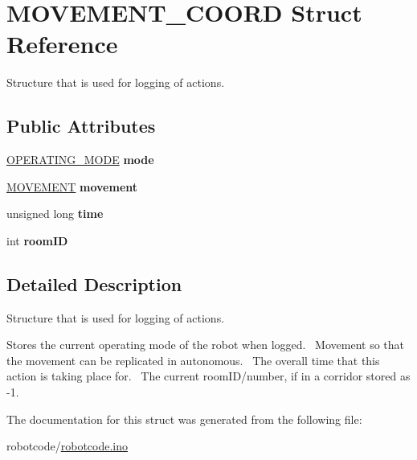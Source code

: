 \hypertarget{structMOVEMENT__COORD}{\section{M\+O\+V\+E\+M\+E\+N\+T\+\_\+\+C\+O\+O\+R\+D Struct Reference}
\label{structMOVEMENT__COORD}
}


Structure that is used for logging of actions.  


\subsection*{Public Attributes}
\begin{DoxyCompactItemize}
\item 
\hypertarget{structMOVEMENT__COORD_a0c9331c535e2f29e15afd2a3f9b58da4}{\hyperlink{robotcode_8ino_a980e950615d86dadef54f3cfaefb5fb4}{O\+P\+E\+R\+A\+T\+I\+N\+G\+\_\+\+M\+O\+D\+E} {\bfseries mode}}\label{structMOVEMENT__COORD_a0c9331c535e2f29e15afd2a3f9b58da4}

\item 
\hypertarget{structMOVEMENT__COORD_a047c0f163ebf1b8d20961ca37aa4539a}{\hyperlink{robotcode_8ino_adc716dd21485bffb9015eaeb3cfe6859}{M\+O\+V\+E\+M\+E\+N\+T} {\bfseries movement}}\label{structMOVEMENT__COORD_a047c0f163ebf1b8d20961ca37aa4539a}

\item 
\hypertarget{structMOVEMENT__COORD_ad2bf7f74f2489fc76f8ba8590835d040}{unsigned long {\bfseries time}}\label{structMOVEMENT__COORD_ad2bf7f74f2489fc76f8ba8590835d040}

\item 
\hypertarget{structMOVEMENT__COORD_a7a052451926c762dfcc4df2c41e4a0b1}{int {\bfseries room\+I\+D}}\label{structMOVEMENT__COORD_a7a052451926c762dfcc4df2c41e4a0b1}

\end{DoxyCompactItemize}


\subsection{Detailed Description}
Structure that is used for logging of actions. 

Stores the current operating mode of the robot when logged.~\newline
Movement so that the movement can be replicated in autonomous.~\newline
The overall time that this action is taking place for.~\newline
The current room\+I\+D/number, if in a corridor stored as -\/1. 

The documentation for this struct was generated from the following file\+:\begin{DoxyCompactItemize}
\item 
robotcode/\hyperlink{robotcode_8ino}{robotcode.\+ino}\end{DoxyCompactItemize}
